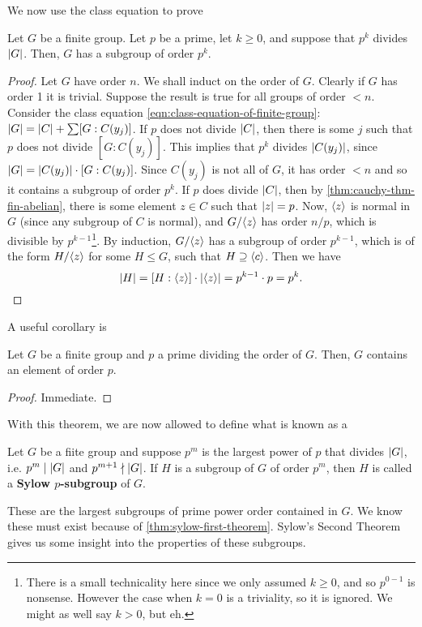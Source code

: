 \documentclass[./main.tex]{subfiles}
\begin{document}
We now use the class equation to prove
\begin{theorem}
\label{thm:sylow-first-theorem}
    Let $G$ be a finite group. Let $p$ be a prime, let $k \geq 0$, and suppose
    that $p^k$ divides $\abs G$. Then, $G$ has a subgroup of order $p^k$.
\end{theorem}
\begin{proof}
    Let $G$ have order $n$. We shall induct on the order of $G$. Clearly if $G$
    has order 1 it is trivial. Suppose the result is true for all groups of
    order $<n$. Consider the class equation
    \cref{eqn:class-equation-of-finite-group}: $\abs G = \abs C + \sum
    [G:C(y_j)]$. If $p$ does not divide $\abs C$, then there is some $j$ such
    that $p$ does not divide $[G:C(y_j)]$. This implies that $p^k$ divides
    $\abs{C(y_j)}$, since $\abs G = \abs{C(y_j)} \cdot [G:C(y_j)]$. Since
    $C(y_j)$ is not all of $G$, it has order $<n$ and so it contains a subgroup
    of order $p^k$. If $p$ does divide $\abs C$, then by
    \cref{thm:cauchy-thm-fin-abelian}, there is some element $z \in C$ such that
    $\abs z = p$. Now, ${ \langle z \rangle }$ is normal in $G$ (since any subgroup of $C$ is
    normal), and $G/{ \langle z \rangle }$ has order $n/p$, which is divisible by
    $p^{k-1}$\footnote{There is a small technicality here since we only assumed
    $k \geq 0$, and so $p^{0-1}$ is nonsense. However the case when $k = 0$ is a
    triviality, so it is ignored. We might as well say $k > 0$, but eh.}. By
    induction, $G/{ \langle z \rangle }$ has a subgroup of order $p^{k-1}$, which is of the
    form $H/{ \langle z \rangle }$ for some $H \leq G$, such that $H \supseteq { \langle c \rangle }$. Then we
    have
    \[
        \abs H = [H : \gen z] \cdot \abs{\gen z} = p^{k-1} \cdot p = p^k.
    \]
\end{proof}

A useful corollary is 
\begin{corollary}
\label{cor:cauchy-thm-finite-groups}
    Let $G$ be a finite group and $p$ a prime dividing the order of $G$. Then,
    $G$ contains an element of order $p$.
\end{corollary}
\begin{proof}
    Immediate.
\end{proof}

With this theorem, we are now allowed to define what is known as a
\begin{definition}
    Let $G$ be a fiite group and suppose $p^m$ is the largest power of $p$ that
    divides $\abs G$, i.e. $p^m \mid \abs G$ and $p^{m+1} \nmid \abs G$. If $H$
    is a subgroup of $G$ of order $p^m$, then $H$ is called a \textbf{Sylow
    $p$-subgroup} of $G$.
\end{definition}
These are the largest subgroups of prime power order contained in $G$. We know
these must exist because of \cref{thm:sylow-first-theorem}. Sylow's Second
Theorem gives us some insight into the properties of these subgroups.
\end{document}
